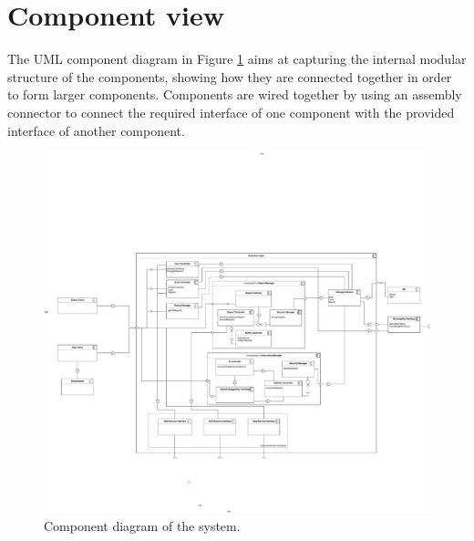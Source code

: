 \documentclass{report}
\begin{document}
\section{Component view}
The UML component diagram in Figure \ref{fig:componentdiagram} aims at capturing the internal modular structure of the components, showing how they are connected together in order to form larger components. Components are wired together by using an assembly connector to connect the required interface of one component with the provided interface of another component.
\begin{figure}[!ht]
	\begin{center}
	\includegraphics[width=\textwidth]{img/Component2_33.pdf}
    \end{center}
    \label{fig:componentdiagram}
	\caption{Component diagram of the system.}
\end{figure}
\end{document}
